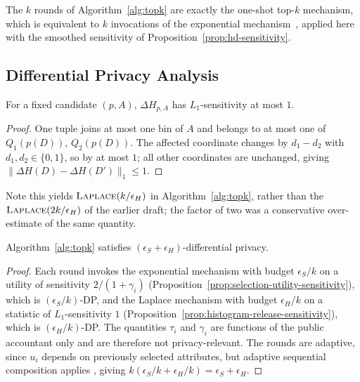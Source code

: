 The $k$ rounds of Algorithm~\ref{alg:topk} are exactly the one-shot top-$k$ mechanism, which is equivalent to $k$ invocations of the exponential mechanism~\cite{TaoGMR22}, applied here with the smoothed sensitivity of Proposition~\ref{prop:hd-sensitivity}.

\subsection{Differential Privacy Analysis}
\label{subsec:dp-proof}

\begin{proposition}
\label{prop:histogram-release-sensitivity}
For a fixed candidate $(p,A)$, $\Delta H_{p,A}$ has $L_1$-sensitivity at most $1$.
\end{proposition}

\begin{proof}
One tuple joins at most one bin of $A$ and belongs to at most one of $Q_1(p(D))$, $Q_2(p(D))$.
The affected coordinate changes by $d_1-d_2$ with $d_1,d_2\in\{0,1\}$, so by at most $1$; all other coordinates are unchanged, giving $\|\Delta H(D)-\Delta H(D')\|_1\le 1$.
\end{proof}

Note this yields $\textsc{Laplace}(k/\epsilon_H)$ in Algorithm~\ref{alg:topk}, rather than the $\textsc{Laplace}(2k/\epsilon_H)$ of the earlier draft; the factor of two was a conservative over-estimate of the same quantity.

\begin{proposition}
\label{thm:alg2-dp}
Algorithm~\ref{alg:topk} satisfies $(\epsilon_S+\epsilon_H)$-differential privacy.
\end{proposition}

\begin{proof}
Each round invokes the exponential mechanism with budget $\epsilon_S/k$ on a utility of sensitivity $2/(1+\gamma_i)$ (Proposition~\ref{prop:selection-utility-sensitivity}), which is $(\epsilon_S/k)$-DP, and the Laplace mechanism with budget $\epsilon_H/k$ on a statistic of $L_1$-sensitivity $1$ (Proposition~\ref{prop:histogram-release-sensitivity}), which is $(\epsilon_H/k)$-DP.
The quantities $\tau_i$ and $\gamma_i$ are functions of the public accountant only and are therefore not privacy-relevant.
The rounds are adaptive, since $u_i$ depends on previously selected attributes, but adaptive sequential composition applies \cite{DBLP:series/synthesis/2016Li}, giving $k(\epsilon_S/k+\epsilon_H/k)=\epsilon_S+\epsilon_H$.
\end{proof}


